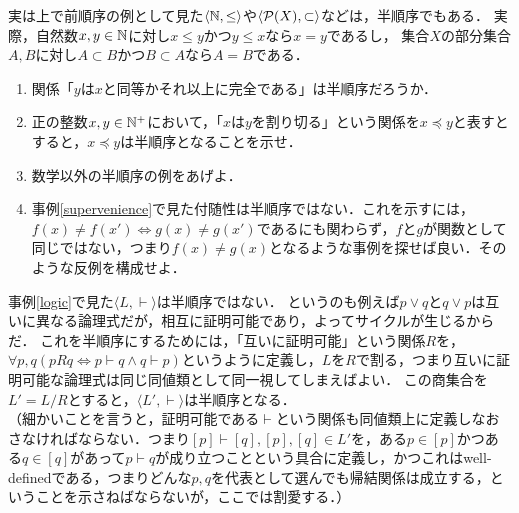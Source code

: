 \documentclass[dvipdfmx,11pt,a4paper]{jsarticle}
\begin{document}
実は上で前順序の例として見た$\langle \mathbb{N}, \leq \rangle$や$\langle \mathcal{P}(X), \subset \rangle$などは，半順序でもある．
実際，自然数$x, y \in \mathbb{N}$に対し$x \leq y$かつ$y \leq x$なら$x=y$であるし，
集合$X$の部分集合$A, B$に対し$A \subset B$かつ$B \subset A$なら$A=B$である．

\begin{exercise}
\begin{enumerate}
 \item 関係「$y$は$x$と同等かそれ以上に完全である」は半順序だろうか．
 \item 正の整数$x, y \in \mathbb{N}^+$において，「$x$は$y$を割り切る」という関係を$x \preceq y$と表すとすると，$x \preceq y$は半順序となることを示せ．
 \item 数学以外の半順序の例をあげよ．
 \item 事例\ref{supervenience}で見た付随性は半順序ではない．これを示すには，$f(x) \neq f(x') \iff g(x) \neq g(x')$であるにも関わらず，$f$と$g$が関数として同じではない，つまり$f(x) \neq g(x)$となるような事例を探せば良い．そのような反例を構成せよ．
\end{enumerate}
\end{exercise}

事例\ref{logic}で見た$\langle L, \vdash \rangle$は半順序ではない．
というのも例えば$p \vee q$と$q \vee p$は互いに異なる論理式だが，相互に証明可能であり，よってサイクルが生じるからだ．
これを半順序にするためには，「互いに証明可能」という関係$R$を，$\forall p, q (pRq \iff p \vdash q \wedge q \vdash p)$というように定義し，$L$を$R$で割る，つまり互いに証明可能な論理式は同じ同値類として同一視してしまえばよい．
この商集合を$L' = L/R$とすると，$\langle L', \vdash \rangle$は半順序となる．\\
（細かいことを言うと，証明可能である$\vdash$という関係も同値類上に定義しなおさなければならない．つまり$[p]\vdash[q], [p], [q] \in L'$を，ある$p \in [p]$かつある$q \in [q]$があって$p \vdash q$が成り立つことという具合に定義し，かつこれはwell-definedである，つまりどんな$p, q$を代表として選んでも帰結関係は成立する，ということを示さねばならないが，ここでは割愛する．）
\end{document}
